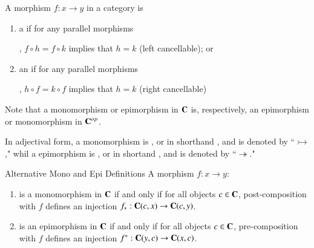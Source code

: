 \documentclass[12pt]{report}
\begin{document}
\begin{defn}{}{}
    A morphism $f:x\rightarrow y$ in a category is \begin{enumerate}
        \item a  if for any parallel morphisms , $f\circ h = f\circ k$ implies that $h = k$ (left cancellable); or
        \item an  if for any parallel morphisms , $h\circ f = k\circ f$ implies that $h = k$ (right cancellable)
    \end{enumerate}
\end{defn}

\begin{rmk}{}{}
    Note that a monomorphism or epimorphism in $\normalfont\textbf{C}$ is, respectively, an epimorphism or monomorphism in $\normalfont\textbf{C}^{op}$.
\end{rmk}

\begin{nota*}{}{}
    In adjectival form, a monomorphism is , or in shorthand , and is denoted by ``$\rightarrowtail$," whil a epimorphism is , or in shortand , and is denoted by ``$\twoheadrightarrow$."
\end{nota*}

\begin{defn}{Alternative Mono and Epi Definitions}{}
    A morphism $f:x\rightarrow y$:\begin{enumerate}
        \item is a monomorphism in $\normalfont\textbf{C}$ if and only if for all objects $c \in \normalfont\textbf{C}$, post-composition with $f$ defines an injection $f_*:\normalfont\textbf{C}(c,x)\rightarrow \normalfont\textbf{C}(c,y)$.
        \item is an epimorphism in $\normalfont\textbf{C}$ if and only if for all objects $c \in \normalfont\textbf{C}$, pre-composition with $f$ defines an injection $f^*:\normalfont\textbf{C}(y,c)\rightarrow \normalfont\textbf{C}(x,c)$.
    \end{enumerate}
\end{defn}
\end{document}

